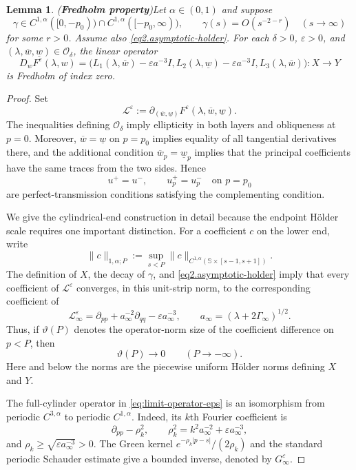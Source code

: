 \documentclass[11pt,reqno]{amsart}
\numberwithin{equation}{section}
\newtheorem{lemma}[theorem]{Lemma}
\theoremstyle{definition}
\theoremstyle{remark}
\begin{document}
\begin{lemma}({\bf Fredholm property})\label{lem4.2}
Let $\alpha\in(0,1)$ and suppose
\[
 \gamma\in C^{1,\alpha}([0,-p_0))
 \cap C^{1,\alpha}([-p_0,\infty)),
 \qquad \gamma(s)=O(s^{-2-r})\quad(s\to\infty)
\]
for some $r>0$. Assume also \eqref{eq2.asymptotic-holder}.  For
each $\delta>0$, $\varepsilon>0$, and
$(\lambda,\overline{w},\underline{w})\in \mathcal{O}_{\delta}$, the
linear operator
\[
 D_wF^{\varepsilon}(\lambda,w)
 =\bigl(L_1(\lambda,\overline w)-\varepsilon a^{-3}I,
 L_2(\lambda,\underline w)-\varepsilon a^{-3}I,
 L_3(\lambda,\overline w)\bigr):X\longrightarrow Y
\]
is Fredholm of index zero.
\end{lemma}
\begin{proof}
Set
\[
 \mathcal L^\varepsilon
 :=\partial_{(\overline w,\underline w)}F^\varepsilon
 (\lambda,\overline w,\underline w).
\]
The inequalities defining $\mathcal O_\delta$ imply ellipticity in
both layers and obliqueness at $p=0$.  Moreover,
$\overline w=\underline w$ on $p=p_0$ implies equality of all
tangential derivatives there, and the additional condition
$\overline w_p=\underline w_p$ implies that the principal
coefficients have the same traces from the two sides.  Hence
\[
 u^+=u^-,\qquad u_p^+=u_p^-
 \quad\text{on }p=p_0
\]
are perfect-transmission conditions satisfying the complementing
condition.

We give the cylindrical-end construction in detail because the
endpoint H\"older scale requires one important distinction.  For a
coefficient $c$ on the lower end, write
\[
 \|c\|_{1,\alpha;P}:=
 \sup_{s<P}\|c\|_{C^{1,\alpha}
 (\mathbb S\times[s-1,s+1])}.
\]
The definition of $X$, the decay of $\gamma$, and
\eqref{eq2.asymptotic-holder} imply that every coefficient of
$\mathcal L^\varepsilon$ converges, in this unit-strip norm, to the
corresponding coefficient of
\begin{equation}\label{eq:limit-operator-eps}
 \mathcal L_\infty^\varepsilon
 =\partial_{pp}+a_\infty^{-2}\partial_{qq}
  -\varepsilon a_\infty^{-3},
 \qquad a_\infty=(\lambda+2\Gamma_\infty)^{1/2}.
\end{equation}
Thus, if $\vartheta(P)$ denotes the operator-norm size of the
coefficient difference on $p<P$, then
\begin{equation}\label{eq:tail-coefficient-small}
 \vartheta(P)\longrightarrow0\qquad(P\to-\infty).
\end{equation}
Here and below the norms are the piecewise uniform H\"older norms
defining $X$ and $Y$.

The full-cylinder operator in \eqref{eq:limit-operator-eps} is an
isomorphism from periodic $C^{3,\alpha}$ to periodic
$C^{1,\alpha}$.  Indeed, its $k$th Fourier coefficient is
\[
 \partial_{pp}-\rho_k^2,
 \qquad
 \rho_k^2=k^2a_\infty^{-2}+\varepsilon a_\infty^{-3},
\]
and $\rho_k\geq\sqrt{\varepsilon a_\infty^{-3}}>0$.  The Green
kernel $e^{-\rho_k|p-s|}/(2\rho_k)$ and the standard periodic
Schauder estimate give a bounded inverse, denoted by
$G_\infty^\varepsilon$.


\end{proof}
\end{document}
